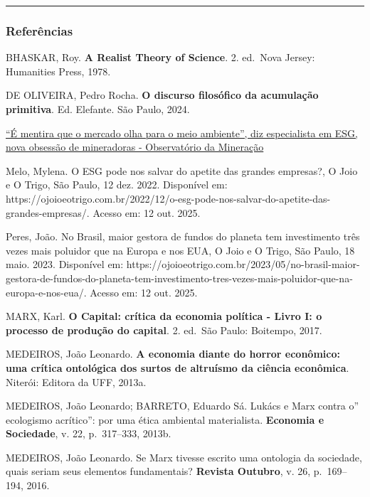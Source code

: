 \begin{center}\rule{0.5\linewidth}{0.5pt}\end{center}

\hypertarget{referuxeancias}{%
\subsubsection{Referências}\label{referuxeancias}}

BHASKAR, Roy. \textbf{A Realist Theory of Science}. 2. ed.~Nova Jersey:
Humanities Press, 1978.

DE OLIVEIRA, Pedro Rocha. \textbf{O discurso filosófico da acumulação
primitiva}. Ed. Elefante. São Paulo, 2024.

\href{https://observatoriodamineracao.com.br/e-mentira-que-o-mercado-olha-para-o-meio-ambiente-diz-especialista-em-esg-nova-obsessao-de-mineradoras/?utm_source=pocket_saves}{``É
mentira que o mercado olha para o meio ambiente'', diz especialista em
ESG, nova obsessão de mineradoras - Observatório da Mineração}

Melo, Mylena. O ESG pode nos salvar do apetite das grandes empresas?, O
Joio e O Trigo, São Paulo, 12 dez. 2022. Disponível em:
https://ojoioeotrigo.com.br/2022/12/o-esg-pode-nos-salvar-do-apetite-das-grandes-empresas/.
Acesso em: 12 out. 2025.

Peres, João. No Brasil, maior gestora de fundos do planeta tem
investimento três vezes mais poluidor que na Europa e nos EUA, O Joio e
O Trigo, São Paulo, 18 maio. 2023. Disponível em:
https://ojoioeotrigo.com.br/2023/05/no-brasil-maior-gestora-de-fundos-do-planeta-tem-investimento-tres-vezes-mais-poluidor-que-na-europa-e-nos-eua/.
Acesso em: 12 out. 2025.

MARX, Karl. \textbf{O Capital: crítica da economia política - Livro I: o
processo de produção do capital}. 2. ed.~São Paulo: Boitempo, 2017.

MEDEIROS, João Leonardo. \textbf{A economia diante do horror econômico:
uma crítica ontológica dos surtos de altruísmo da ciência econômica}.
Niterói: Editora da UFF, 2013a.

MEDEIROS, João Leonardo; BARRETO, Eduardo Sá. Lukács e Marx contra o''
ecologismo acrítico'': por uma ética ambiental materialista.
\textbf{Economia e Sociedade}, v. 22, p.~317--333, 2013b.

MEDEIROS, João Leonardo. Se Marx tivesse escrito uma ontologia da
sociedade, quais seriam seus elementos fundamentais? \textbf{Revista
Outubro}, v. 26, p.~169--194, 2016.

